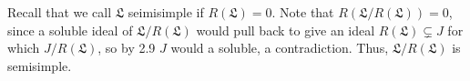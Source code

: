 Recall that we call $\mathfrak{L}$ seimisimple if $R(\mathfrak{L}) = 0$.
Note that $R(\mathfrak{L}/R(\mathfrak{L}))= 0$, since a soluble ideal of $\mathfrak{L}/R(\mathfrak{L})$
would pull back to give an ideal $R(\mathfrak{L}) \subsetneq J$ for which
$J/R(\mathfrak{L})$, so by 2.9  $J$ would a soluble, a contradiction.
Thus, $\mathfrak{L}/R(\mathfrak{L})$ is semisimple.
